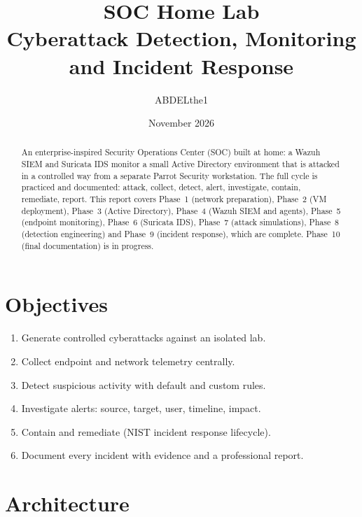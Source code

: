 \documentclass[11pt,a4paper]{article}
\title{SOC Home Lab\\[0.3em]
  \large Cyberattack Detection, Monitoring and Incident Response}
\author{ABDELthe1}
\date{November 2026}
\begin{document}
\maketitle

\begin{abstract}
An enterprise-inspired Security Operations Center (SOC) built at home: a Wazuh
SIEM and Suricata IDS monitor a small Active Directory environment that is
attacked in a controlled way from a separate Parrot Security workstation. The
full cycle is practiced and documented: attack, collect, detect, alert,
investigate, contain, remediate, report. This report covers Phase~1 (network
preparation), Phase~2 (VM deployment), Phase~3 (Active Directory), Phase~4
(Wazuh SIEM and agents), Phase~5 (endpoint monitoring), Phase~6 (Suricata
IDS), Phase~7 (attack simulations), Phase~8 (detection engineering) and
Phase~9 (incident response), which are complete. Phase~10 (final
documentation) is in progress.
\end{abstract}

\tableofcontents
\newpage

\section{Objectives}

\begin{enumerate}
  \item Generate controlled cyberattacks against an isolated lab.
  \item Collect endpoint and network telemetry centrally.
  \item Detect suspicious activity with default and custom rules.
  \item Investigate alerts: source, target, user, timeline, impact.
  \item Contain and remediate (NIST incident response lifecycle).
  \item Document every incident with evidence and a professional report.
\end{enumerate}

\section{Architecture}
\end{document}
